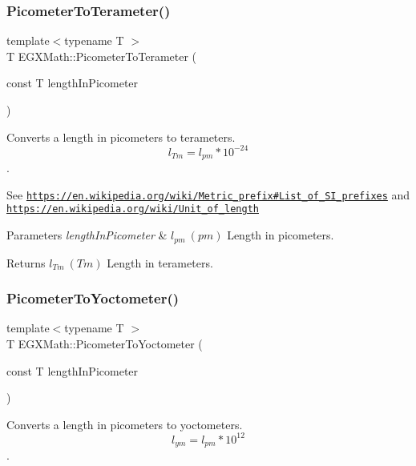 \subsubsection{\texorpdfstring{Picometer\+To\+Terameter()}{PicometerToTerameter()}}
{\footnotesize\ttfamily template$<$typename T $>$ \\
T E\+G\+X\+Math\+::\+Picometer\+To\+Terameter (\begin{DoxyParamCaption}\item[{const T}]{length\+In\+Picometer }\end{DoxyParamCaption})}



Converts a length in picometers to terameters. \[ l_{Tm}=l_{pm} * 10^{-24} \]. 

See \href{https://en.wikipedia.org/wiki/Metric_prefix#List_of_SI_prefixes}{\tt https\+://en.\+wikipedia.\+org/wiki/\+Metric\+\_\+prefix\#\+List\+\_\+of\+\_\+\+S\+I\+\_\+prefixes} and \href{https://en.wikipedia.org/wiki/Unit_of_length}{\tt https\+://en.\+wikipedia.\+org/wiki/\+Unit\+\_\+of\+\_\+length} 
\begin{DoxyParams}{Parameters}
{\em length\+In\+Picometer} & $ l_{pm}\ (pm)$ Length in picometers. \\
\hline
\end{DoxyParams}
\begin{DoxyReturn}{Returns}
$ l_{Tm}\ (Tm)$ Length in terameters. 
\end{DoxyReturn}
\mbox{\label{group___e_g_x_math-_conversions-_length_conversions-_s_i-_picometer-_s_i_ga503eda76d6647261c50ec147c78dfbbc}} 
\subsubsection{\texorpdfstring{Picometer\+To\+Yoctometer()}{PicometerToYoctometer()}}
{\footnotesize\ttfamily template$<$typename T $>$ \\
T E\+G\+X\+Math\+::\+Picometer\+To\+Yoctometer (\begin{DoxyParamCaption}\item[{const T}]{length\+In\+Picometer }\end{DoxyParamCaption})}



Converts a length in picometers to yoctometers. \[ l_{ym}=l_{pm} * 10^{12} \]. 

